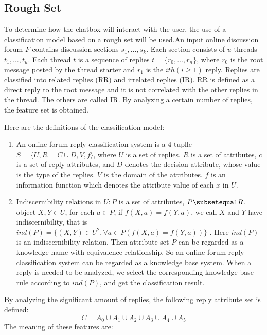 \documentclass[11pt,technote,twocolumn]{IEEEtran}
\begin{document}
\subsection{Rough Set}
To determine how the chatbox will interact with the user, the use of a classification model based on a rough set will be used.An input online discussion forum $F$ contains discussion sections $s_1, \dots, s_k$. Each section consists of $u$ threads $t_1, \ldots, t_u$. Each thread $t$ is a sequence of replies $t = \{r_0, \dots, r_n\}$, where $r_0$ is the root message posted by the thread starter and $r_1$ is the $ith(i \geq 1)$ reply. Replies are classified into related replies (RR) and irrelated replies (IR). RR is defined as a direct reply to the root message and it is not correlated with the other replies in the thread. The others are called IR. By analyzing a certain number of replies, the feature set is obtained.\cite{4663330}
\par 
Here are the definitions of the classification model:
\begin{enumerate}
    \item An online forum reply classification system is a 4-tuplle $S = \{ U, R = C \cup D, V, f \rangle$, where $U$ is a set of replies. $R$ is a set of attributes, $c$ is a set of reply attributes, and $D$ denotes the decision attribute, whose value is the type of the replies. $V$ is the domain of the attributes. $f$ is an information function which denotes the attribute value of each $x$ in $U$.
    \item Indiscernibility relations in $U : P$ is a set of attributes, $P \subsetequal R$, object $X, Y \in U$, for each $a \in P$, if $f(X, a) = f(Y, a)$, we call $X$ and $Y$ have indiscernibility, that is $ind(P) = \{(X,Y) \in U^2, \forall a \in P(f(X,a) = f(Y,a))\}$ . Here $ind(P)$ is an indiscernibility relation. Then attribute set $P$ can be regarded as a knowledge name with equivalence relationship. So an online forum reply classification system can be regarded as a knowledge base system. When a reply is needed to be analyzed, we select the corresponding knowledge base rule according to $ind(P)$, and get the classification result.
\end{enumerate}
By analyzing the significant amount of replies, the following reply attribute set is defined:
\begin{equation} \tag{12}
    C = A_0 \cup A_1 \cup A_2 \cup A_3 \cup A_4 \cup A_5
\end{equation}
The meaning of these features are:
\end{document}
